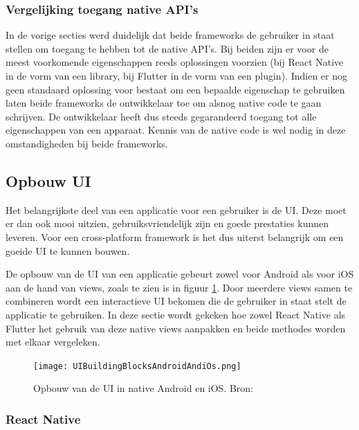 \subsubsection{Vergelijking toegang native API's}
\label{subsubsec:vglToegangNativeAPIs}

In de vorige secties werd duidelijk dat beide frameworks de gebruiker in staat stellen om toegang te hebben tot de native API's. Bij beiden zijn er voor de meest voorkomende eigenschappen reeds oplossingen voorzien (bij React Native in de vorm van een library, bij Flutter in de vorm van een plugin). Indien er nog geen standaard oplossing voor bestaat om een bepaalde eigenschap te gebruiken laten beide frameworks de ontwikkelaar toe om alsnog native code te gaan schrijven. De ontwikkelaar heeft dus steeds gegarandeerd toegang tot alle eigenschappen van een apparaat. Kennis van de native code is wel nodig in deze omstandigheden bij beide frameworks.


\subsection{Opbouw UI}
\label{subsec:opbouwUI}

Het belangrijkste deel van een applicatie voor een gebruiker is de UI. Deze moet er dan ook mooi uitzien, gebruiksvriendelijk zijn en goede prestaties kunnen leveren. Voor een cross-platform framework is het dus uiterst belangrijk om een goeide UI te kunnen bouwen. 

De opbouw van de UI van een applicatie gebeurt zowel voor Android als voor iOS aan de hand van views, zoals te zien is in figuur \ref{fig:opbouwUIAndroidiOS}. Door meerdere views samen te combineren wordt een interactieve UI bekomen die de gebruiker in staat stelt de applicatie te gebruiken. In deze sectie wordt gekeken hoe zowel React Native als Flutter het gebruik van deze native views aanpakken en beide methodes worden met elkaar vergeleken.

\begin{figure}
\texttt{[image: UIBuildingBlocksAndroidAndiOs.png]}
\caption{Opbouw van de UI in native Android en iOS. Bron:
    \textcite{ReactNative.dev2020}}
\label{fig:opbouwUIAndroidiOS}
\end{figure}

\subsubsection{React Native}
\label{subsubsec:opbouwUIReactNative} 


